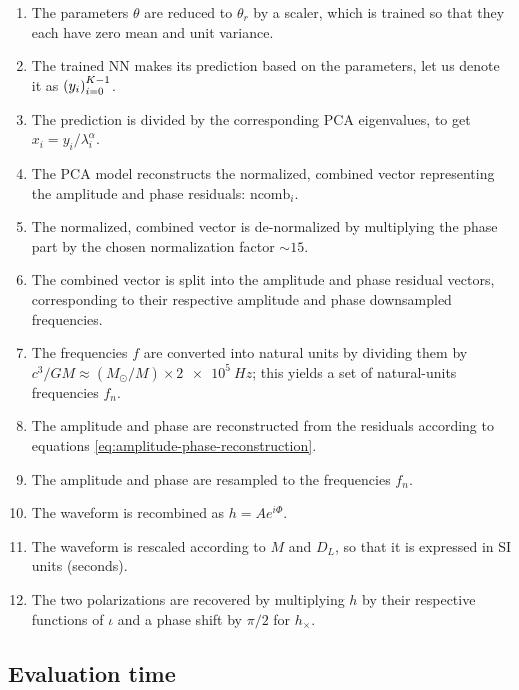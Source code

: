 \documentclass[main.tex]{subfiles}
\begin{document}
\begin{enumerate}
    \item The parameters \(\theta \) are reduced to \(\theta _r\) by a scaler, which is trained so that they each have zero mean and unit variance. \label{item:param-reduction}
    \item The trained \ac{NN} makes its prediction based on the parameters, let us denote it as \(\qty(y_i)_{i=0}^{K-1}\). \label{item:nn-prediction}
    \item The prediction is divided by the corresponding \ac{PCA} eigenvalues, to get \(x_i = y_i / \lambda _i^{\alpha }\).
    \item The \ac{PCA} model reconstructs the normalized, combined vector representing the amplitude and phase residuals: \(\text{ncomb}_i\). \label{item:pca-reconstruction}
    \item The normalized, combined vector is de-normalized by multiplying the phase part by the chosen normalization factor \(\sim 15\).
    \item The combined vector is split into the amplitude and phase residual vectors, corresponding to their respective amplitude and phase downsampled frequencies. \label{item:combined-split}
    \item The frequencies \(f\) are converted into natural units by dividing them by \(c^3 / GM \approx (M_{\odot} / M) \times  \SI{2e5}{Hz}\); this yields a set of natural-units frequencies \(f_n\). \label{item:frequency-conversion}
    \item The amplitude and phase are reconstructed from the residuals according to equations \eqref{eq:amplitude-phase-reconstruction}. \label{item:tf2}
    \item The amplitude and phase are resampled to the frequencies \(f_n\). \label{item:resample}
    \item The waveform is recombined as \(h = A e^{i \Phi }\). \label{item:recombine}
    \item The waveform is rescaled according to \(M\) and \(D_L\), so that it is expressed in SI units (seconds). \label{item:rescale}
    \item The two polarizations are recovered by multiplying \(h\) by their respective functions of \(\iota \) and a phase shift by \(\pi /2\) for \(h_ \times \). \label{item:polarizations}
\end{enumerate}


\subsection{Evaluation time} \label{sec:evaluation-time}
\end{document}
